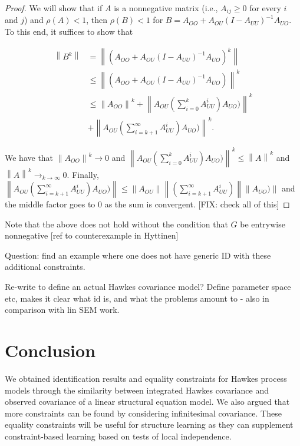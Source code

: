\documentclass[accepted]{uai2021} %
\newcommand{\norm}[1]{\left\lVert#1\right\rVert}
\begin{document}
\begin{proof}
	We will show that if $A$ is a nonnegative matrix (i.e., $A_{ij} \geq 0$ for 
	every $i$ and $j$) and $\rho(A) < 1$, then $\rho(B) < 1$ for $B = A_{OO} + 
	A_{OU}(I - A_{UU})^{-1}A_{UO}$. To this end, it suffices to show that 
	
	\begin{align*}
		\norm{B^k} &= \norm{(A_{OO} + 
			A_{OU}(I - A_{UU})^{-1}A_{UO})^k} \\
		&\leq \norm{(A_{OO} + 
			A_{OU}(I - A_{UU})^{-1}A_{UO})}^k \\
		&\leq \norm{A_{OO}}^k + \norm{ 
			A_{OU}(\sum_{i=0}^k A_{UU}^i) A_{UO})}^k \\ &+ \norm{
			A_{OU}(\sum_{i=k+1}^\infty A_{UU}^i)A_{UO})}^k.
	\end{align*}
	
	\noindent We have that $\norm{A_{OO}}^k \rightarrow 0$ and $\norm{ 
		A_{OU}(\sum_{i=0}^k A_{UU}^i) A_{UO})}^k \leq \norm{ 
		A}^k $ and $\norm{ 
		A}^k \rightarrow_{k\rightarrow \infty} 0$. Finally, $\norm{
		A_{OU}(\sum_{i=k+1}^\infty A_{UU}^i)A_{UO})} \leq \norm{
		A_{OU}}\norm{(\sum_{i=k+1}^\infty A_{UU}^i)}\norm{A_{UO})}$ and the 
		middle factor goes to 0 as the sum is convergent. [FIX: check all of 
		this]


	
	
\end{proof}

Note that the above does not hold without the condition that $G$ be entrywise 
nonnegative [ref to counterexample in Hyttinen]

Question: find an example where one does not have generic ID with these 
additional constraints.

Re-write to define an actual Hawkes covariance model? Define parameter space 
etc, makes it clear what id is, and what the problems amount to - also in 
comparison with lin SEM work.

\section{Conclusion}

We obtained identification results and equality constraints for Hawkes process 
models through the similarity between integrated Hawkes covariance and observed 
covariance of a linear structural equation model. We also argued that more 
constraints can be found by considering infinitesimal covariance. These 
equality constraints will be useful for structure learning as they can 
supplement constraint-based learning based on tests of local independence.
\end{document}
